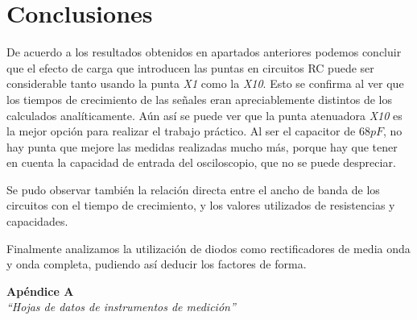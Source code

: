 \documentclass{article}
\begin{document}
\section{Conclusiones}

	De acuerdo a los resultados obtenidos en apartados anteriores podemos concluir que el efecto de carga que introducen las puntas en circuitos RC puede ser considerable tanto usando la punta \textit{X1} como la \textit{X10}. Esto se confirma al ver que los tiempos de crecimiento de las señales eran apreciablemente distintos de los calculados analíticamente. Aún así se puede ver que la punta atenuadora \textit{X10} es la mejor opción para realizar el trabajo práctico. Al ser el capacitor de $68 pF$, no hay punta que mejore las medidas realizadas mucho más, porque hay que tener en cuenta la capacidad de entrada del osciloscopio, que no se puede despreciar. 
	\par
	Se pudo observar también la relación directa entre el ancho de banda de los circuitos con el tiempo de crecimiento, y los valores utilizados de resistencias y capacidades. 
	\par
	Finalmente analizamos la utilización de diodos como rectificadores de media onda y onda completa, pudiendo así deducir los factores de forma.
\bigskip\bigskip


\newpage \textit{}
\newpage



\newpage
\vspace*{4cm}
\begin{center}
	\textbf{\Huge{Apéndice A}} \\
	\bigskip\bigskip
	\Large{\textit{``Hojas de datos de instrumentos de medición''}}
\end{center}


\newpage \textit{}
\newpage
\end{document}
